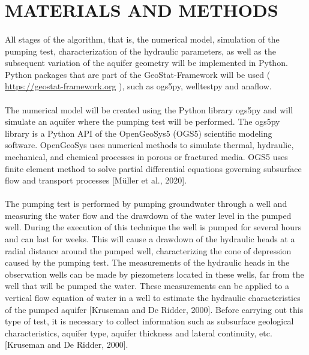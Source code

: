 \documentclass[11pt, a4paper]{article}
\begin{document}
    \section{MATERIALS AND METHODS}
    \paragraph{} %
    All stages of the algorithm, that is, the numerical model, simulation of the pumping test, characterization of the hydraulic parameters, as well as the subsequent variation of the aquifer geometry will be implemented in Python. Python packages that are part of the GeoStat-Framework will be used ( \url{https://geostat-framework.org} ), such as ogs5py, welltestpy and anaflow.
    \paragraph{} %
    The numerical model will be created using the Python library ogs5py and will simulate an aquifer where the pumping test will be performed. The ogs5py library is a Python API of the OpenGeoSys5 (OGS5) scientific modeling software. OpenGeoSys uses numerical methods to simulate thermal, hydraulic, mechanical, and chemical processes in porous or fractured media. OGS5 uses finite element method to solve partial differential equations governing subsurface flow and transport processes [Müller et al., 2020].
    \paragraph{} %
    The pumping test is performed by pumping groundwater through a well and measuring the water flow and the drawdown of the water level in the pumped well. During the execution of this technique the well is pumped for several hours and can last for weeks. This will cause a drawdown of the hydraulic heads at a radial distance around the pumped well, characterizing the cone of depression caused by the pumping test. The measurements of the hydraulic heads in the observation wells can be made by piezometers located in these wells, far from the well that will be pumped the water. These measurements can be applied to a vertical flow equation of water in a well to estimate the hydraulic characteristics of the pumped aquifer [Kruseman and De Ridder, 2000]. Before carrying out this type of test, it is necessary to collect information such as subsurface geological characteristics, aquifer type, aquifer thickness and lateral continuity, etc. [Kruseman and De Ridder, 2000].
\end{document}
